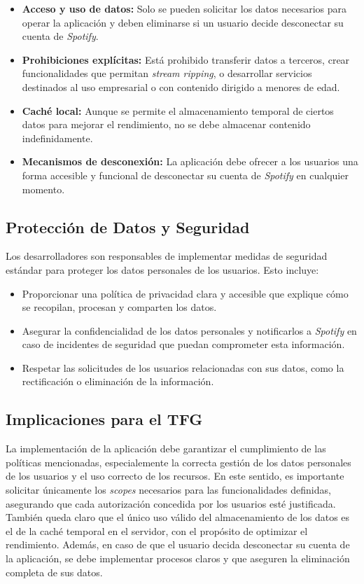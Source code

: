 \begin{itemize}
    \item \textbf{Acceso y uso de datos:} Solo se pueden solicitar los datos necesarios para operar la aplicación y deben eliminarse si un usuario decide desconectar su cuenta de \textit{Spotify}.
    \item \textbf{Prohibiciones explícitas:} Está prohibido transferir datos a terceros, crear funcionalidades que permitan \textit{stream ripping}, o desarrollar servicios destinados al uso empresarial o con contenido dirigido a menores de edad.
    \item \textbf{Caché local:} Aunque se permite el almacenamiento temporal de ciertos datos para mejorar el rendimiento, no se debe almacenar contenido indefinidamente.
    \item \textbf{Mecanismos de desconexión:} La aplicación debe ofrecer a los usuarios una forma accesible y funcional de desconectar su cuenta de \textit{Spotify} en cualquier momento.
\end{itemize}

\newpage

\subsection{Protección de Datos y Seguridad}

Los desarrolladores son responsables de implementar medidas de seguridad estándar para proteger los datos personales de los usuarios. Esto incluye:

\begin{itemize}
    \item Proporcionar una política de privacidad clara y accesible que explique cómo se recopilan, procesan y comparten los datos.
    \item Asegurar la confidencialidad de los datos personales y notificarlos a \textit{Spotify} en caso de incidentes de seguridad que puedan comprometer esta información.
    \item Respetar las solicitudes de los usuarios relacionadas con sus datos, como la rectificación o eliminación de la información.
\end{itemize}

\subsection{Implicaciones para el TFG}

La implementación de la aplicación debe garantizar el cumplimiento de las políticas mencionadas, especialemente la correcta gestión de los datos personales de los usuarios y el uso correcto de los recursos. En este sentido, es importante solicitar únicamente los \textit{scopes} necesarios para las funcionalidades definidas, asegurando que cada autorización concedida por los usuarios esté justificada. También queda claro que el único uso válido del almacenamiento de los datos es el de la caché temporal en el servidor, con el propósito de optimizar el rendimiento. Además, en caso de que el usuario decida desconectar su cuenta de la aplicación, se debe implementar procesos claros y que aseguren la eliminación completa de sus datos.

